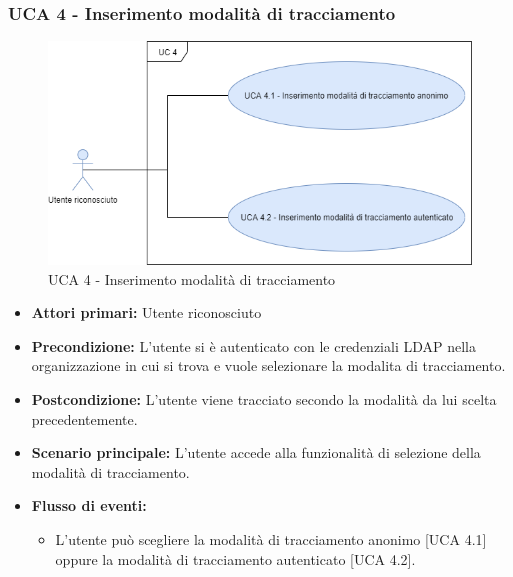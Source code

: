 \newpage
\subsubsection{UCA 4 - Inserimento modalità di tracciamento}%

\begin{figure}[h]
	\centering	
	\includegraphics[scale=0.53]{sezioni/UseCase/Immagini/UCA4.png}
	\caption{UCA 4 - Inserimento modalità di tracciamento}
\end{figure}

\begin{itemize}
	\item \textbf{Attori primari:} Utente riconosciuto
	\item \textbf{Precondizione:} L'utente si è autenticato con le credenziali LDAP nella organizzazione in cui si trova e vuole selezionare la modalita di tracciamento.
	\item \textbf{Postcondizione:} L'utente viene tracciato secondo la modalità da lui scelta precedentemente.
	\item \textbf{Scenario principale:} L'utente accede alla funzionalità di selezione della modalità di tracciamento.
	\item \textbf{Flusso di eventi:}
	\begin{itemize}
		\item L'utente può scegliere la modalità di tracciamento anonimo [UCA 4.1] oppure la modalità di tracciamento autenticato [UCA 4.2].
	\end{itemize}
\end{itemize}

